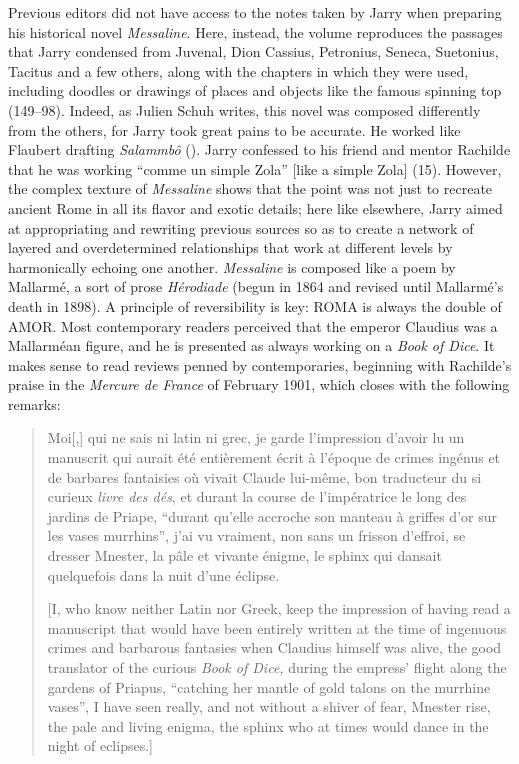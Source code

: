 \begin{review}
Previous editors did not have access to the notes taken by Jarry when
preparing his historical novel \emph{Messaline}. Here, instead, the
volume reproduces the passages that Jarry condensed from Juvenal, Dion
Cassius, Petronius, Seneca, Suetonius, Tacitus and a few others, along
with the chapters in which they were used, including doodles or drawings
of places and objects like the famous spinning top (149--98). Indeed, as
Julien Schuh writes, this novel was composed differently from the
others, for Jarry took great pains to be accurate. He worked like
Flaubert drafting \emph{Salammbô} (\citeyear{flaubert_salammbo_1862}). Jarry confessed to his friend and
mentor Rachilde that he was working ``comme un simple Zola'' [like a simple Zola] (15). However, the complex texture of \emph{Messaline}
shows that the point was not just to recreate ancient Rome in all its
flavor and exotic details; here like elsewhere, Jarry aimed at
appropriating and rewriting previous sources so as to create a network
of layered and overdetermined relationships that work at different
levels by harmonically echoing one another. \emph{Messaline} is composed
like a poem by Mallarmé, a sort of prose \emph{Hérodiade} (begun in 1864 and revised until Mallarmé's death in 1898). A principle
of reversibility is key: ROMA is always the double of AMOR. Most
contemporary readers perceived that the emperor Claudius was a
Mallarméan figure, and he is presented as always working on a \emph{Book
of Dice}. It makes sense to read reviews penned by contemporaries,
beginning with Rachilde's praise in the \emph{Mercure de France} of February 1901, which closes with the following remarks:

\begin{quote}
Moi[,] qui ne sais ni latin ni grec, je garde l’impression d’avoir lu un manuscrit qui aurait été entièrement écrit à l’époque de crimes ingénus et de barbares fantaisies où vivait Claude lui-même, bon traducteur du si curieux \emph{livre des dés}, et durant la course de l’impératrice le long des jardins de Priape, ``durant qu’elle accroche son manteau à griffes d’or sur les vases murrhins'', j’ai vu vraiment, non sans un frisson d’effroi, se dresser Mnester, la pâle et vivante énigme, le sphinx qui dansait quelquefois dans la nuit d’une éclipse.

\vspace{1em}

[I, who know neither Latin nor Greek, keep the impression of having read a
manuscript that would have been entirely written at the time of
ingenuous crimes and barbarous fantasies when Claudius himself was
alive, the good translator of the curious \emph{Book of Dice,} during
the empress' flight along the gardens of Priapus, ``catching her mantle
of gold talons on the murrhine vases'', I have seen really, and not
without a shiver of fear, Mnester rise, the pale and living enigma, the
sphinx who at times would dance in the night of eclipses.]


\end{quote}
\end{review}
